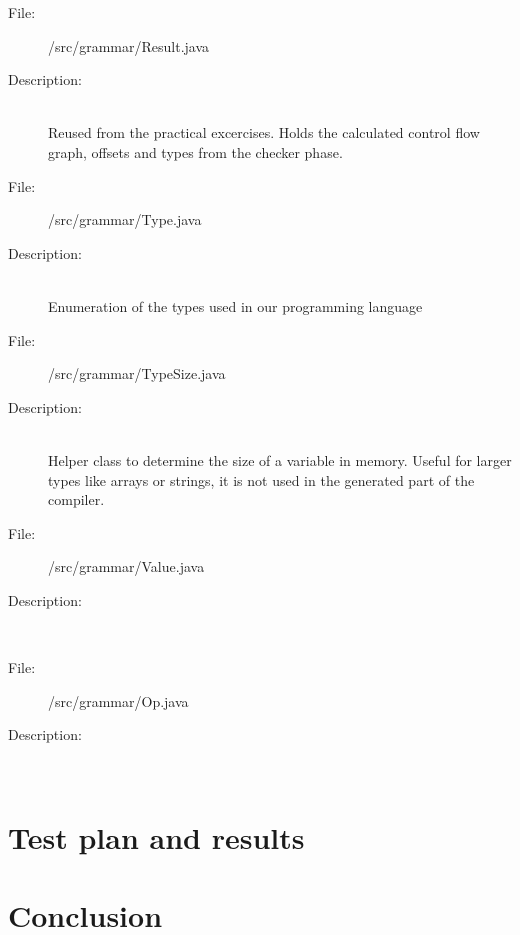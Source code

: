 \documentclass[10pt,a4paper]{report}
\begin{document}
\begin{description}
	\item[File:] /src/grammar/Result.java
	\item[Description:] \hfill \\
		Reused from the practical excercises. Holds the calculated control flow graph, offsets and types from the checker phase. 
\end{description}

\begin{description}
	\item[File:] /src/grammar/Type.java
	\item[Description:] \hfill \\
		Enumeration of the types used in our programming language
\end{description}

\begin{description}
	\item[File:] /src/grammar/TypeSize.java
	\item[Description:] \hfill \\
		Helper class to determine the size of a variable in memory. Useful for larger types like arrays or strings, it is not used in the generated part of the compiler.
\end{description}

\begin{description}
	\item[File:] /src/grammar/Value.java
	\item[Description:] \hfill \\
\end{description}

\begin{description}
	\item[File:] /src/grammar/Op.java
	\item[Description:] \hfill \\
\end{description}

\chapter{Test plan and results}

\chapter{Conclusion}
\end{document}
